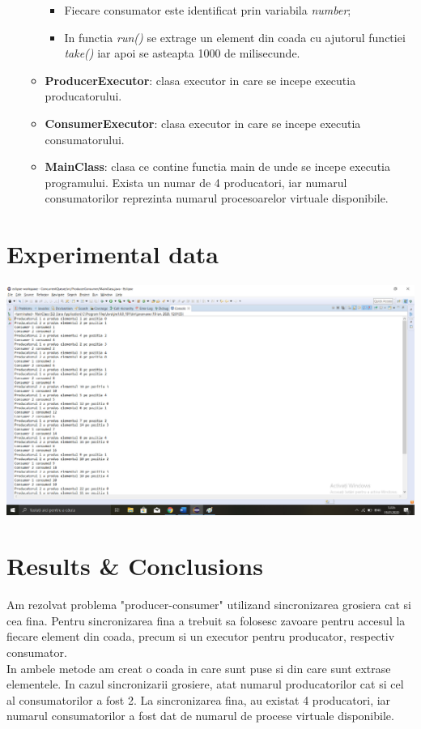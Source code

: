\documentclass{article}
\begin{document}
\begin{itemize}
\begin{itemize}
    \begin{itemize}
        \item Fiecare consumator este identificat prin variabila \textit{number};
        \item In functia \textit{run()} se extrage un element din coada cu ajutorul functiei \textit{take()} iar apoi se asteapta 1000 de milisecunde.
    \end{itemize}   
    \item \textbf{ProducerExecutor}: clasa executor in care se incepe executia producatorului.
    \item \textbf{ConsumerExecutor}: clasa executor in care se incepe executia consumatorului.
    \item \textbf{MainClass}: clasa ce contine functia main de unde se incepe executia programului. Exista un numar de 4 producatori, iar numarul consumatorilor reprezinta numarul procesoarelor virtuale disponibile.
    \end{itemize}
\end{itemize}
\section{Experimental data}

\includegraphics[]{Producer-Consumer.png}

\section{Results \& Conclusions}
Am rezolvat problema "producer-consumer" utilizand sincronizarea grosiera cat si cea fina. Pentru sincronizarea fina a trebuit sa folosesc zavoare pentru accesul la fiecare element din coada, precum si un executor pentru producator, respectiv consumator.\\ 
In ambele metode am creat o coada in care sunt puse si din care sunt extrase elementele. In cazul sincronizarii grosiere, atat numarul producatorilor cat si cel al consumatorilor a fost 2. La sincronizarea fina, au existat 4 producatori, iar numarul consumatorilor a fost dat de numarul de procese virtuale disponibile.
\end{document}
